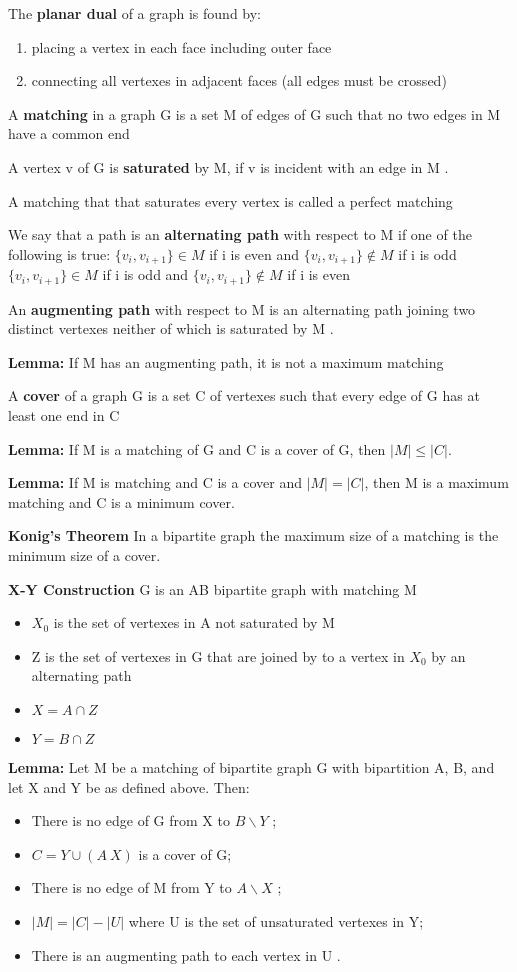 \documentclass[12pt]{article}
\begin{document}
The \textbf{planar dual} of a graph is found by:
\begin{enumerate}
    \item placing a vertex in each face including outer face
    \item connecting all vertexes in adjacent faces (all edges must be crossed)
\end{enumerate}

A \textbf{matching} in a graph G is a set M of edges of G such that no two edges in M have a common end

A vertex v of G is \textbf{saturated} by M, if v is incident with an edge in M .

A matching that that saturates every vertex is called a perfect matching

We say that a path is an \textbf{alternating path} with respect to M if one of the following is true:
$\{v_i , v_{i +1} \} \in M$ if i is even and $\{v_i , v_{i +1} \} \notin M$ if i is odd
$\{v_i , v_{i +1} \} \in M$ if i is odd and $\{v_i , v_{i +1} \} \notin M$ if i is even

An \textbf{augmenting path} with respect to M is an alternating path joining two distinct vertexes neither of which is saturated by M .

\textbf{Lemma:} If M has an augmenting path, it is not a maximum matching

A \textbf{cover} of a graph G is a set C of vertexes such that every edge of G has at least one end in C

\textbf{Lemma:} If M is a matching of G and C is a cover of G, then $|M| \leq |C|$.

\textbf{Lemma:} If M is matching and C is a cover and $|M| = |C|$, then M is a maximum matching and C is a minimum cover.

\textbf{Konig's Theorem}
In a bipartite graph the maximum size of a matching is the minimum size of a cover.

\textbf{X-Y Construction}
G is an AB bipartite graph with matching M
\begin{itemize}
    \item $X_0$ is the set of vertexes in A not saturated by M
    \item Z is the set of vertexes in G that are joined by to a vertex in $X_0$ by an alternating path
    \item $X = A \cap Z$
    \item $Y = B \cap Z$
\end{itemize}

\textbf{Lemma:} Let M be a matching of bipartite graph G with bipartition A, B, and let X and Y be as defined above. Then:
\begin{itemize}
    \item There is no edge of G from X to  $B \backslash Y$ ;
    \item $C = Y \cup (A \ X )$ is a cover of G;
    \item There is no edge of M from Y to $A \backslash X$ ;
    \item $|M | = |C|-|U |$ where U is the set of unsaturated vertexes in Y;
    \item There is an augmenting path to each vertex in U .
\end{itemize}
\end{document}
